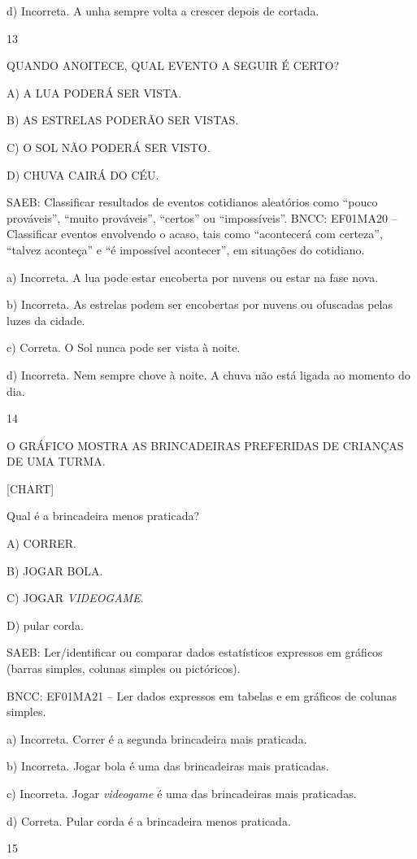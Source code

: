 \begin{itemize}
\begin{itemize}
d) Incorreta. A unha sempre volta a crescer depois de cortada.

\num{13}

QUANDO ANOITECE, QUAL EVENTO A SEGUIR É CERTO?

A) A LUA PODERÁ SER VISTA.

B) AS ESTRELAS PODERÃO SER VISTAS.

C) O SOL NÃO PODERÁ SER VISTO.

D) CHUVA CAIRÁ DO CÉU.

SAEB: Classificar resultados de eventos cotidianos aleatórios como
``pouco prováveis'', ``muito prováveis'', ``certos'' ou ``impossíveis''.
BNCC: EF01MA20 -- Classificar eventos envolvendo o acaso, tais como
``acontecerá com certeza'', ``talvez aconteça'' e ``é impossível
acontecer'', em situações do cotidiano.

a) Incorreta. A lua pode estar encoberta por nuvens ou estar na fase nova.

b) Incorreta. As estrelas podem ser encobertas por nuvens ou ofuscadas pelas luzes da cidade.

c) Correta. O Sol nunca pode ser vista à noite.

d) Incorreta. Nem sempre chove à noite. A chuva não está ligada ao
momento do dia.

\num{14}

O GRÁFICO MOSTRA AS BRINCADEIRAS PREFERIDAS DE CRIANÇAS DE UMA TURMA.

{{[}CHART{]}}

Qual é a brincadeira menos praticada?

A) CORRER.

B) JOGAR BOLA.

C) JOGAR \textit{VIDEOGAME}.

D) pular corda.

SAEB: Ler/identificar ou comparar dados estatísticos expressos
em gráficos (barras simples, colunas simples ou pictóricos).

BNCC: EF01MA21 -- Ler dados expressos em tabelas e em gráficos de colunas
simples.

a) Incorreta. Correr é a segunda brincadeira mais praticada.

b) Incorreta. Jogar bola é uma das brincadeiras mais praticadas.

c) Incorreta. Jogar \textit{videogame} é uma das brincadeiras mais praticadas.

d) Correta. Pular corda é a brincadeira menos praticada.

\num{15}


\end{itemize}
\end{itemize}
